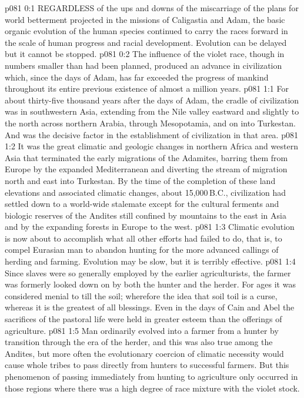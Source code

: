 \vs p081 0:1 REGARDLESS of the ups and downs of the miscarriage of the plans for world betterment projected in the missions of Caligastia and Adam, the basic organic evolution of the human species continued to carry the races forward in the scale of human progress and racial development. Evolution can be delayed but it cannot be stopped.
\vs p081 0:2 The influence of the violet race, though in numbers smaller than had been planned, produced an advance in civilization which, since the days of Adam, has far exceeded the progress of mankind throughout its entire previous existence of almost a million years.
\vs p081 1:1 For about thirty\hyp{}five thousand years after the days of Adam, the cradle of civilization was in southwestern Asia, extending from the Nile valley eastward and slightly to the north across northern Arabia, through Mesopotamia, and on into Turkestan. And  was the decisive factor in the establishment of civilization in that area.
\vs p081 1:2 It was the great climatic and geologic changes in northern Africa and western Asia that terminated the early migrations of the Adamites, barring them from Europe by the expanded Mediterranean and diverting the stream of migration north and east into Turkestan. By the time of the completion of these land elevations and associated climatic changes, about 15,000\,B.C., civilization had settled down to a world\hyp{}wide stalemate except for the cultural ferments and biologic reserves of the Andites still confined by mountains to the east in Asia and by the expanding forests in Europe to the west.
\vs p081 1:3 Climatic evolution is now about to accomplish what all other efforts had failed to do, that is, to compel Eurasian man to abandon hunting for the more advanced callings of herding and farming. Evolution may be slow, but it is terribly effective.
\vs p081 1:4 Since slaves were so generally employed by the earlier agriculturists, the farmer was formerly looked down on by both the hunter and the herder. For ages it was considered menial to till the soil; wherefore the idea that soil toil is a curse, whereas it is the greatest of all blessings. Even in the days of Cain and Abel the sacrifices of the pastoral life were held in greater esteem than the offerings of agriculture.
\vs p081 1:5 Man ordinarily evolved into a farmer from a hunter by transition through the era of the herder, and this was also true among the Andites, but more often the evolutionary coercion of climatic necessity would cause whole tribes to pass directly from hunters to successful farmers. But this phenomenon of passing immediately from hunting to agriculture only occurred in those regions where there was a high degree of race mixture with the violet stock.
